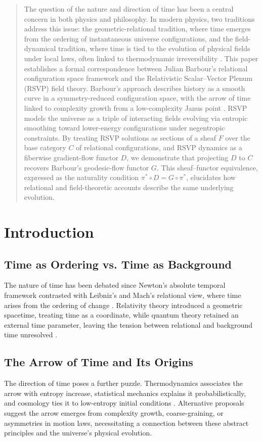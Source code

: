 \documentclass[11pt]{article}
\begin{document}
\begin{abstract}
The question of the nature and direction of time has been a central concern in both physics and philosophy. In modern physics, two traditions address this issue: the geometric-relational tradition, where time emerges from the ordering of instantaneous universe configurations, and the field-dynamical tradition, where time is tied to the evolution of physical fields under local laws, often linked to thermodynamic irreversibility \citep{Barbour1999, Rovelli2004}. This paper establishes a formal correspondence between Julian Barbour’s relational configuration space framework and the Relativistic Scalar–Vector Plenum (RSVP) field theory. Barbour’s approach describes history as a smooth curve in a symmetry-reduced configuration space, with the arrow of time linked to complexity growth from a low-complexity Janus point \citep{Barbour2014}. RSVP models the universe as a triple of interacting fields evolving via entropic smoothing toward lower-energy configurations under negentropic constraints. By treating RSVP solutions as sections of a sheaf $F$ over the base category $C$ of relational configurations, and RSVP dynamics as a fiberwise gradient-flow functor $D$, we demonstrate that projecting $D$ to $C$ recovers Barbour’s geodesic-flow functor $G$. This sheaf–functor equivalence, expressed as the naturality condition $\pi^* \circ D = G \circ \pi^*$, elucidates how relational and field-theoretic accounts describe the same underlying evolution.
\end{abstract}

\section{Introduction}

\subsection{Time as Ordering vs. Time as Background}
The nature of time has been debated since Newton’s absolute temporal framework contrasted with Leibniz’s and Mach’s relational view, where time arises from the ordering of change \citep{Newton1687, Leibniz1715}. Relativity theory introduced a geometric spacetime, treating time as a coordinate, while quantum theory retained an external time parameter, leaving the tension between relational and background time unresolved \citep{Einstein1915}.

\subsection{The Arrow of Time and Its Origins}
The direction of time poses a further puzzle. Thermodynamics associates the arrow with entropy increase, statistical mechanics explains it probabilistically, and cosmology ties it to low-entropy initial conditions \citep{Penrose1989}. Alternative proposals suggest the arrow emerges from complexity growth, coarse-graining, or asymmetries in motion laws, necessitating a connection between these abstract principles and the universe’s physical evolution.
\end{document}
